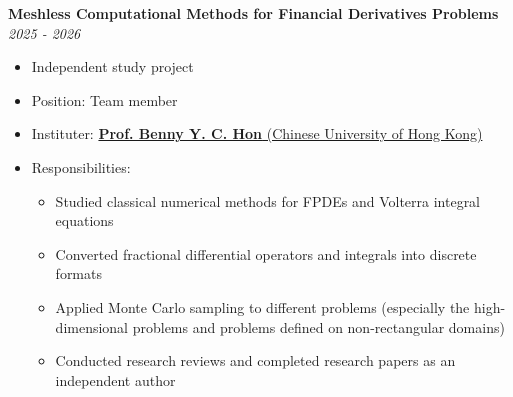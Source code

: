 \documentclass[11pt,a4paper]{article}
\newcommand{\cvitem}[2]{\textbf{#1} \hfill \textit{#2}}
\begin{document}
\vspace{0.5cm} %
\cvitem{Meshless Computational Methods for Financial Derivatives Problems}{\textit{2025 - 2026}}
\begin{itemize}[leftmargin=*,nosep]
    \item Independent study project
    \item Position: Team member
    \item Instituter: \href{https://scholar.google.com/citations?user=QO54wjoAAAAJ}{\textbf{Prof. Benny Y. C. Hon} (Chinese University of Hong Kong)}
    \item Responsibilities:
    \begin{itemize}[leftmargin=*,nosep]
        \item Studied classical numerical methods for FPDEs and Volterra integral equations
        \item Converted fractional differential operators and integrals into discrete formats
        \item Applied Monte Carlo sampling to different problems (especially the high-dimensional problems and problems defined on non-rectangular domains)
        \item Conducted research reviews and completed research papers as an independent author
    \end{itemize}
\end{itemize}


\end{document}
